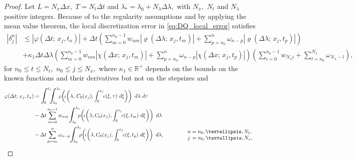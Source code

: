 \documentclass[10pt,a4paper]{amsart}
\begin{document}
\begin{proof}
    Let $L=N_x \Delta x,$ $T=N_t \Delta t$ and $\lambda_{*} =\lambda_{0}+ N_\lambda \Delta \lambda,$ with $N_x,$ $N_t$ and $N_\lambda$ positive integers. Because of to the regularity assumptions and by applying the mean value theorem, the local discretization error in \eqref{eq:DQ_local_error} satisfies 
    \begin{equation}\label{eq:partial_bound_DQ_cons}
        \begin{split}
             |\delta_j^n|&\leq |\varphi (\Delta t;  \, x_j, t_n)|+\Delta t\left( \sum_{m=0}^{n_0-1} w_{n m} |\varrho(\Delta \lambda;  \, x_j, t_{m})| + \sum_{p=n_0}^{n} \omega_{n-p} |\varrho(\Delta \lambda;  \, x_j, t_{p})| \right) \\
             &+\kappa_1 \Delta t \Delta \lambda 
             \left(\sum_{m=0}^{n_0-1} w_{n m}|\chi(\Delta x;  \, x_j, t_{m})|+\sum_{p=n_0}^{n}  \omega_{n-p}|\chi(\Delta x;  \, x_j, t_{p})|\right)
             \left( \sum_{i=0}^{n_0-1} w_{N_\lambda i}  + \sum_{l=n_0}^{N_\lambda} \omega_{N_\lambda-l} \right),
        \end{split}
    \end{equation}
    for $n_0\leq t\leq N_t,$ $n_0\leq j\leq N_x,$ where $\kappa_1\in \mathbb{R}^+$ depends on the bounds on the known functions and their derivatives but not on the stepsizes and 
    \begin{equation*}
        \begin{split}
            \varphi (\Delta t;  \, x_j, t_n)&= \scalebox{1.3}{$\displaystyle\int$}_{\!\!\!\!\! 0}^{t_n} \!\!\! \scalebox{1.3}{$\displaystyle\int$}_{\!\!\!\!\! \lambda_{0}}^{\lambda_{*}} \!\!\! \rho \! \left( \! \iota \! \left(\lambda,\, C_0(x_j), \int_0^{x_j} \!\! c(\xi,\tau)  \ d\xi\right)\right) \ d\lambda \ d \tau \\
            &- \Delta t\sum_{m=0}^{n_0-1} w_{n m} \scalebox{1.3}{$\displaystyle\int$}_{\!\!\!\!\! \lambda_0}^{\lambda_*} \!\!\! \rho \! \left( \! \iota \! \left(\lambda, C_0(x_j) , \int_0^{x_j} \!\! c(\xi,t_m)  \ d\xi \right) \right) \ d\lambda \\
            &- \Delta t \sum_{p=n_0}^{n} \omega_{n-p} \scalebox{1.3}{$\displaystyle\int$}_{\!\!\!\!\! \lambda_0}^{\lambda_*} \!\!\! \rho \! \left( \! \iota \! \left(\lambda, C_0(x_j) , \int_0^{x_j} \!\!   c(\xi,t_p)  \ d\xi \right) \right) \ d\lambda, 
            \qquad \qquad \begin{array}{l}
            n=n_0,\dots, N_t,  \\
            j \, =n_0,\dots, N_x, 

\end{array}
\end{split}
\end{equation*}
\end{proof}
\end{document}
